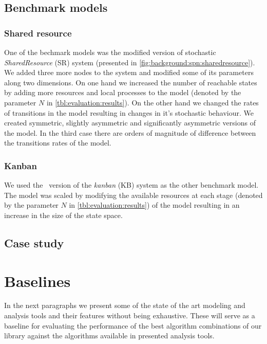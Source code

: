 \subsection{Benchmark models}

\subsubsection{Shared resource}

One of the bechmark models was the modified version of stochastic \emph{SharedResource} (SR) system (presented in \cref{fig:background:spn:sharedresource}). We added three more nodes to the system and modified some of its parameters along two dimensions. On one hand we increased the number of reachable states by adding more resources and local processes to the model (denoted by the parameter $N$ in \cref{tbl:evaluation:results}). On the other hand we changed the rates of transitions in the model resulting in changes in it's stochastic  behaviour. We created symmetric, slightly asymmetric and significantly asymmetric versions of the model. In the third case there are orders of magnitude of difference between the transitions rates of the model.  

\subsubsection{Kanban}

We used the \SPN\ version of the \emph{kanban} (KB) system \citep{ciardo2003logical} as the other benchmark model. The model was scaled by modifying the available resources at each stage (denoted by the parameter $N$ in \cref{tbl:evaluation:results}) of the model resulting in an increase in the size of the state space.

\subsection{Case study}



\section{Baselines}

In the next paragraphs we present some of the state of the art modeling and analysis tools and their features without being exhaustive. These will serve as a baseline for evaluating the performance of the best algorithm combinations of our library against the algorithms available in presented analysis tools.

